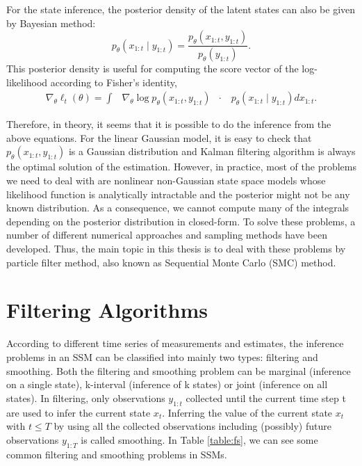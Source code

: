 \documentclass[mstat,12pt]{unswthesis}  %
\numberwithin{equation}{section}
\begin{document}
\noindent For the state inference, the  posterior density of the latent
states can also be given by Bayesian method:
\begin{equation}p_{\theta}\left(x_{1: t} \mid y_{1: t}\right)=\frac{p_{\theta}\left(x_{1: t}, y_{1: t}\right)}{p_{\theta}\left(y_{1: t}\right)}.\end{equation}
This posterior density is  useful for computing the
score vector of the log-likelihood according to 
Fisher’s identity,
\begin{equation}\begin{aligned}
\nabla_{\theta} \ell_{t}(\theta)=\int & \nabla_{\theta} \log p_{\theta}\left(x_{1: t}, y_{1: t}\right) 
& \cdot \quad p_{\theta}\left(x_{1: t} \mid y_{1:t}\right) d x_{1: t}.
\end{aligned}\end{equation}

\noindent Therefore, in theory, it seems that it is possible to do the inference from the above equations. 
For the linear Gaussian model, it is easy to check that $p_{\theta}\left(x_{1: t}, y_{1: t}\right) $ is a Gaussian distribution and Kalman filtering algorithm \cite{anderson2012optimal} is always the optimal solution of the estimation.
However, in practice, most of the problems we need to deal with are  nonlinear non-Gaussian state space models
whose likelihood function is analytically intractable and
the posterior might not be
any known distribution. As a consequence, we cannot compute many of the
integrals depending on the posterior distribution in closed-form.
To solve these problems, a number of different numerical approaches and sampling methods have been developed.
Thus, the main topic in this thesis is to deal with these problems by particle filter method, also known
as Sequential Monte Carlo (SMC) method.\\

\section{Filtering Algorithms}
\noindent According to different time series of measurements and estimates,
the inference problems in an SSM can be classified into mainly two types: filtering and smoothing.
Both the filtering and smoothing problem can be marginal (inference
on a single state), k-interval (inference of k states) or joint (inference on all states).
In filtering, only observations $y_{1:t}$  collected until the current time step
t  are used to infer the current state $x_{t}$.
Inferring the value of the current state $x_{t}$ with $t \leq T$ by using all the collected observations including (possibly) future observations $y_{1:T}$ is called smoothing.
In Table \ref{table:fs}, we can see some common filtering and smoothing problems in SSMs.
\end{document}
